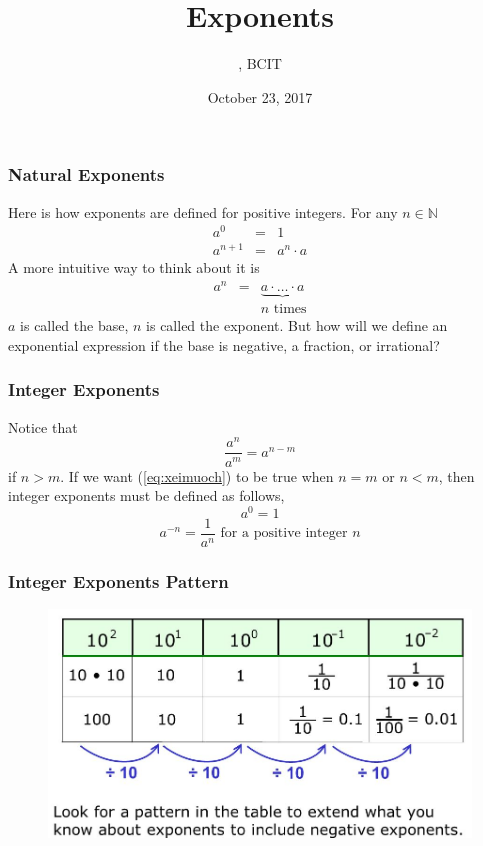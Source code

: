 \documentclass[xcolor=dvipsnames]{beamer}
\title{Exponents}
\subtitle{{\CourseNumber}, BCIT}
\author{\CourseName}
\date{October 23, 2017}
\begin{document}
\begin{frame}
  \titlepage
\end{frame}

\begin{frame}
  \frametitle{Natural Exponents}
  Here is how exponents are defined for positive integers. For any $n\in\mathbb{N}$
  \begin{equation}
    \label{eq:kuliekar}
    \begin{array}{rcl}
      a^{0}&=&1 \\
      a^{n+1}&=&a^{n}\cdot{}a
    \end{array}
  \end{equation}
A more intuitive way to think about it is
\begin{equation}
  \label{eq:ogheenoo}
  \begin{array}{rcl}
    a^{n}&=&\underbrace{a\cdot\ldots\cdot{}a} \\
         &&n\mbox{ times}
  \end{array}
\end{equation}
$a$ is called the \alert{base}, $n$ is called the \alert{exponent}.
But how will we define an exponential expression if the base is
negative, a fraction, or irrational?
\end{frame}

\begin{frame}
  \frametitle{Integer Exponents}
Notice that
\begin{equation}
  \label{eq:xeimuoch}
  \frac{a^{n}}{a^{m}}=a^{n-m}
\end{equation}
if $n>m$. If we want (\ref{eq:xeimuoch}) to be true when $n=m$ or
$n<m$, then integer exponents must be defined as follows,
\begin{equation}
  \label{eq:raishaep}
  a^{0}=1
\end{equation}
\begin{equation}
  \label{eq:pahcahka}
  a^{-n}=\frac{1}{a^{n}}\mbox{ for a positive integer }n
\end{equation}
\end{frame}

\begin{frame}
  \frametitle{Integer Exponents Pattern}
  \begin{figure}[h]
    \includegraphics[scale=.4]{./IntegerExponentsPattern.png}
  \end{figure}
\end{frame}
\end{document}
